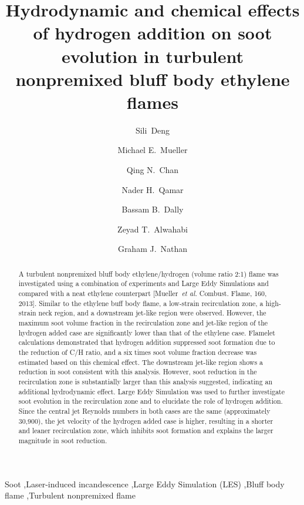\documentclass[review,3p,times]{elsarticle}
\begin{document}
\begin{frontmatter}

\title{Hydrodynamic and chemical effects of hydrogen addition on soot evolution in turbulent nonpremixed bluff body ethylene flames}

\author[Princeton]{Sili~Deng}
\author[Princeton]{Michael E.~Mueller}
\author[NSW]{Qing N.~Chan}
\author[FCT]{Nader H.~Qamar}
\author[Adelaide]{Bassam B.~Dally}
\author[Adelaide]{Zeyad T.~Alwahabi}
\author[Adelaide]{Graham J.~Nathan}

\address[Princeton]{Department of Mechanical and Aerospace Engineering, Princeton University, Princeton, USA}
\address[NSW]{School of Mechanical and Manufacturing Engineering, The University of New South Wales, Australia}
\address[FCT]{FCT-Combustion, Australia}
\address[Adelaide]{Centre for Energy Technology, The University of Adelaide, Australia}

\begin{abstract}

A turbulent nonpremixed bluff body ethylene/hydrogen (volume ratio 2:1) flame was investigated using a combination of experiments and Large Eddy Simulations and compared with a neat ethylene counterpart [Mueller~\emph{et al.} Combust. Flame, 160, 2013].  Similar to the ethylene buff body flame, a low-strain recirculation zone, a high-strain neck region, and a downstream jet-like region were observed.  However, the maximum soot volume fraction in the recirculation zone and jet-like region of the hydrogen added case are significantly lower than that of the ethylene case.  Flamelet calculations demonstrated that hydrogen addition suppressed soot formation due to the reduction of C/H ratio, and a six times soot volume fraction decrease was estimated based on this chemical effect.  The downstream jet-like region shows a reduction in soot consistent with this analysis.  However, soot reduction in the recirculation zone is substantially larger than this analysis suggested, indicating an additional hydrodynamic effect.  Large Eddy Simulation was used to further investigate soot evolution in the recirculation zone and to elucidate the role of hydrogen addition.  Since the central jet Reynolds numbers in both cases are the same (approximately 30,900), the jet velocity of the hydrogen added case is higher, resulting in a shorter and leaner recirculation zone, which inhibits soot formation and explains the larger magnitude in soot reduction.  

\end{abstract}

\begin{keyword} 
Soot \sep Laser-induced incandescence \sep Large Eddy Simulation (LES) \sep Bluff body flame \sep Turbulent nonpremixed flame 
\end{keyword}

\end{frontmatter}
\end{document}
